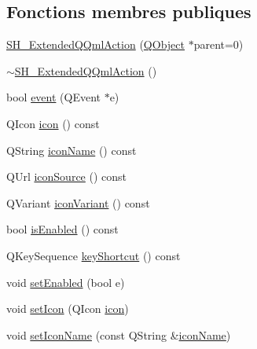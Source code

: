 \subsection*{Fonctions membres publiques}
\begin{DoxyCompactItemize}
\item 
\hyperlink{classSimpleHotel_1_1SH__ExtendedQQmlAction_ad7bdf8c4fc5b5f742af505e76aea7eb6}{S\-H\-\_\-\-Extended\-Q\-Qml\-Action} (\hyperlink{classQObject}{Q\-Object} $\ast$parent=0)
\item 
\hyperlink{classSimpleHotel_1_1SH__ExtendedQQmlAction_a83ec4d750a440efe28cfd81860bd8920}{$\sim$\-S\-H\-\_\-\-Extended\-Q\-Qml\-Action} ()
\item 
bool \hyperlink{classSimpleHotel_1_1SH__ExtendedQQmlAction_af9f8858833e85282453c40556706b52a}{event} (Q\-Event $\ast$e)
\item 
Q\-Icon \hyperlink{classSimpleHotel_1_1SH__ExtendedQQmlAction_a6a8bbcd5a320fae95b3bd85f553c7915}{icon} () const 
\item 
Q\-String \hyperlink{classSimpleHotel_1_1SH__ExtendedQQmlAction_a6351f6a7ef58f8d8a2872c7fd5a0970d}{icon\-Name} () const 
\item 
Q\-Url \hyperlink{classSimpleHotel_1_1SH__ExtendedQQmlAction_a1ce7f4befe1cac01245c9cb393f1e4ac}{icon\-Source} () const 
\item 
Q\-Variant \hyperlink{classSimpleHotel_1_1SH__ExtendedQQmlAction_a14fa0d2554a8f31be0a57a4c8fd1ff74}{icon\-Variant} () const 
\item 
bool \hyperlink{classSimpleHotel_1_1SH__ExtendedQQmlAction_a9b2338d14913efb8b97d9f43bd9396f9}{is\-Enabled} () const 
\item 
Q\-Key\-Sequence \hyperlink{classSimpleHotel_1_1SH__ExtendedQQmlAction_a477ddaee93b9ed008c155f11397a0b16}{key\-Shortcut} () const 
\item 
void \hyperlink{classSimpleHotel_1_1SH__ExtendedQQmlAction_affecbd383cbf070f6c70c0e4e021d696}{set\-Enabled} (bool e)
\item 
void \hyperlink{classSimpleHotel_1_1SH__ExtendedQQmlAction_a44c9dc0a8bed100b5cc935014b073593}{set\-Icon} (Q\-Icon \hyperlink{classSimpleHotel_1_1SH__ExtendedQQmlAction_a6a8bbcd5a320fae95b3bd85f553c7915}{icon})
\item 
void \hyperlink{classSimpleHotel_1_1SH__ExtendedQQmlAction_ae989680dffcc6e86e5ff686136d787a3}{set\-Icon\-Name} (const Q\-String \&\hyperlink{classSimpleHotel_1_1SH__ExtendedQQmlAction_ad87f9f88cf3b5fbad2ab49c71bfe2a1b}{icon\-Name})
\item 

\end{DoxyCompactItemize}
